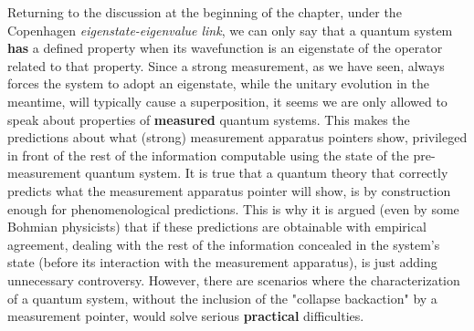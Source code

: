 \documentclass[11pt, a4paper]{article} %
\begin{document}
Returning to the discussion at the beginning of the chapter, under the Copenhagen {\em eigenstate-eigenvalue link}, we can only say that a quantum system {\bf has} a defined property when its wavefunction is an eigenstate of the operator related to that property. Since a strong measurement, as we have seen, always forces the system to adopt an eigenstate, while the unitary evolution in the meantime, will typically cause a superposition, it seems we are only allowed to speak about properties of {\bf measured} quantum systems. This makes the predictions about what (strong) measurement apparatus pointers show, privileged in front of the rest of the information computable using the state of the pre-measurement quantum system. It is true that a quantum theory that correctly predicts what the measurement apparatus pointer will show, is by construction enough for phenomenological predictions. This is why it is argued (even by some Bohmian physicists) that if these predictions are obtainable with empirical agreement, dealing with the rest of the information concealed in the system's state (before its interaction with the measurement apparatus), is just adding unnecessary controversy. However, there are scenarios where the characterization of a quantum system, without the inclusion of the "collapse backaction" by a measurement pointer, would solve serious {\bf practical} difficulties.
\end{document}
